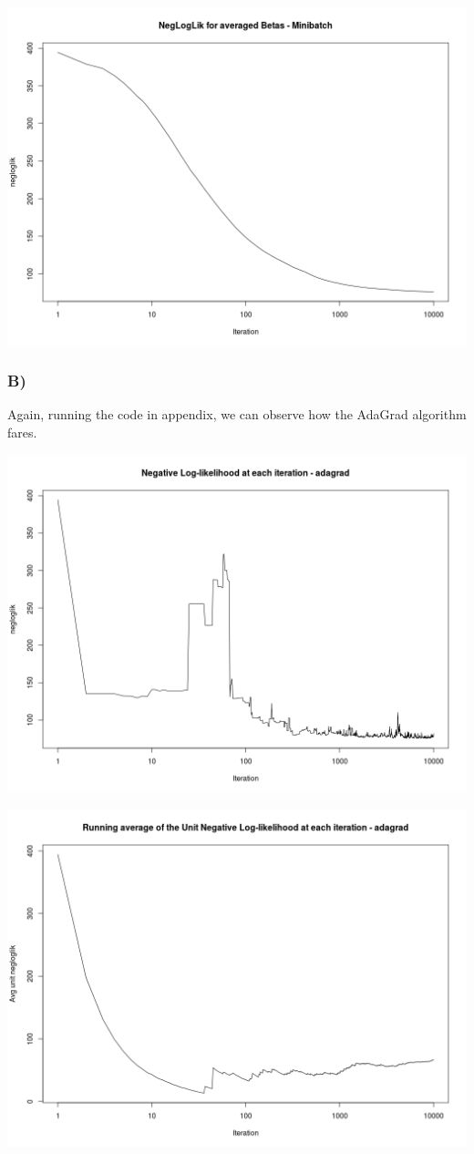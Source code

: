 \documentclass{article}
\begin{document}
\includegraphics[width=\textwidth]{Rplot_minibatch03.png}

\subsubsection*{B)}

Again, running the code in appendix, we can observe how the AdaGrad algorithm fares.

\includegraphics[width=\textwidth]{Rplot_AdaGrad01.png}

\includegraphics[width=\textwidth]{Rplot_AdaGrad02.png}
\end{document}
